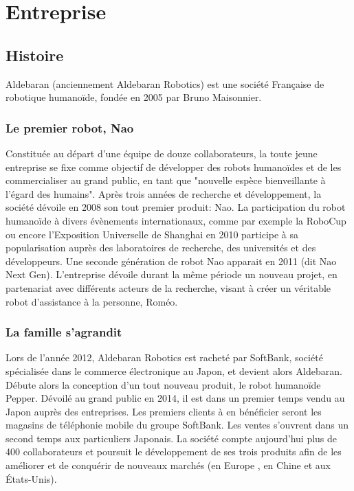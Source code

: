 \chapter{Entreprise}
\label{Entreprise}
\thispagestyle{fancy}

\section{Histoire}
\label{Entreprise: histoire}
Aldebaran (anciennement Aldebaran Robotics) est une société Française de robotique humanoïde, fondée en 2005 par Bruno Maisonnier. 

\subsection{Le premier robot, Nao}
\label{Entreprise:Histoire:Nao}
Constituée au départ d'une équipe de douze collaborateurs, la toute jeune entreprise se fixe comme objectif de développer des robots humanoïdes et de les commercialiser au grand public, en tant que "nouvelle espèce bienveillante à l'égard des humains". Après trois années de recherche et développement, la société dévoile en 2008 son tout premier produit: Nao. La participation du robot humanoïde à divers évènements internationaux, comme par exemple la RoboCup ou encore l'Exposition Universelle de Shanghai en 2010 participe à sa popularisation auprès des laboratoires de recherche, des universités et des développeurs. Une seconde génération de robot Nao apparait en 2011 (dit Nao Next Gen). L'entreprise dévoile durant la même période un nouveau projet, en partenariat avec différents acteurs de la recherche, visant à créer un véritable robot d'assistance à la personne, Roméo. 

\subsection{La famille s'agrandit}
\label{Entreprise: La famille Aldebaran}
Lors de l'année 2012, Aldebaran Robotics est racheté par SoftBank, société spécialisée dans le commerce électronique au Japon, et devient alors Aldebaran. Débute alors la conception d'un tout nouveau produit, le robot humanoïde Pepper. Dévoilé au grand public en 2014, il est dans un premier temps vendu au Japon auprès des entreprises. Les premiers clients à en bénéficier seront les magasins de téléphonie mobile du groupe SoftBank. Les ventes s'ouvrent dans un second temps aux particuliers Japonais. La société compte aujourd'hui plus de 400 collaborateurs et poursuit le développement de ses trois produits afin de les améliorer et de conquérir de nouveaux marchés (en Europe , en Chine et aux États-Unis).


